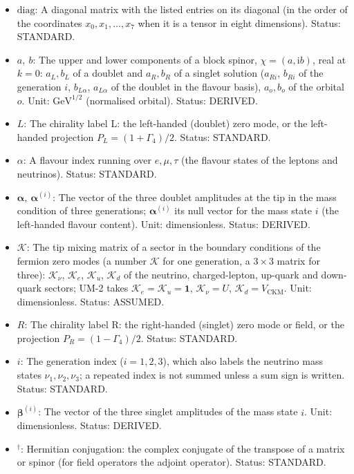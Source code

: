 \documentclass[
  10pt,
]{article}
\providecommand{\tightlist}{%
  \setlength{\itemsep}{0pt}\setlength{\parskip}{0pt}}
\begin{document}
\begin{itemize}
\tightlist
\item
  \(\mathrm{diag}\): A diagonal matrix with the listed entries on its
  diagonal (in the order of the coordinates \(x_0, x_1, \dots, x_7\)
  when it is a tensor in eight dimensions). Status: STANDARD.
\item
  \(a,\ b\): The upper and lower components of a block spinor,
  \(\chi = (a, \mathrm{i}b)\), real at \(k = 0\): \(a_L, b_L\) of a
  doublet and \(a_R, b_R\) of a singlet solution (\(a_{Ri}\), \(b_{Ri}\)
  of the generation \(i\), \(b_{L\alpha}\), \(a_{L\alpha}\) of the
  doublet in the flavour basis), \(a_o, b_o\) of the orbital \(o\).
  Unit: \(\mathrm{GeV}^{1/2}\) (normalised orbital). Status: DERIVED.
\item
  \(L\): The chirality label L: the left-handed (doublet) zero mode, or
  the left-handed projection \(P_L = (1 + \Gamma_4)/2\). Status:
  STANDARD.
\item
  \(\alpha\): A flavour index running over \(e, \mu, \tau\) (the flavour
  states of the leptons and neutrinos). Status: STANDARD.
\item
  \(\boldsymbol{\alpha},\ \boldsymbol{\alpha}^{(i)}\): The vector of the
  three doublet amplitudes at the tip in the mass condition of three
  generations; \(\boldsymbol{\alpha}^{(i)}\) its null vector for the
  mass state \(i\) (the left-handed flavour content). Unit:
  dimensionless. Status: DERIVED.
\item
  \(\mathcal{K}\): The tip mixing matrix of a sector in the boundary
  conditions of the fermion zero modes (a number \(\mathcal{K}\) for one
  generation, a \(3 \times 3\) matrix for three): \(\mathcal{K}_\nu\),
  \(\mathcal{K}_e\), \(\mathcal{K}_u\), \(\mathcal{K}_d\) of the
  neutrino, charged-lepton, up-quark and down-quark sectors; UM-2 takes
  \(\mathcal{K}_e = \mathcal{K}_u = \mathbf{1}\),
  \(\mathcal{K}_\nu = U\), \(\mathcal{K}_d = V_{\mathrm{CKM}}\). Unit:
  dimensionless. Status: ASSUMED.
\item
  \(R\): The chirality label R: the right-handed (singlet) zero mode or
  field, or the projection \(P_R = (1 - \Gamma_4)/2\). Status: STANDARD.
\item
  \(i\): The generation index (\(i = 1, 2, 3\)), which also labels the
  neutrino mass states \(\nu_1, \nu_2, \nu_3\); a repeated index is not
  summed unless a sum sign is written. Status: STANDARD.
\item
  \(\boldsymbol{\beta}^{(i)}\): The vector of the three singlet
  amplitudes of the mass state \(i\). Unit: dimensionless. Status:
  DERIVED.
\item
  \({}^\dagger\): Hermitian conjugation: the complex conjugate of the
  transpose of a matrix or spinor (for field operators the adjoint
  operator). Status: STANDARD.
\end{itemize}
\end{document}
